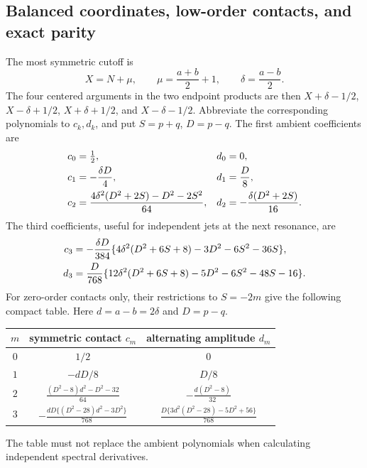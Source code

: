 \documentclass[11pt,letterpaper]{article}
\numberwithin{equation}{section}
\theoremstyle{definition}
\theoremstyle{remark}
\begin{document}
\subsection{Balanced coordinates, low-order contacts, and exact parity}

The most symmetric cutoff is
\begin{equation}\label{ct:balanced}
 X=N+\mu,\qquad \mu=\frac{a+b}{2}+1,\qquad
 \delta=\frac{a-b}{2}.
\end{equation}
The four centered arguments in the two endpoint products are then
$X+\delta-1/2$, $X-\delta+1/2$, $X+\delta+1/2$, and
$X-\delta-1/2$. Abbreviate the corresponding polynomials to $c_k,d_k$,
and put $S=p+q$, $D=p-q$. The first ambient coefficients are
\begin{align}
 c_0&=\tfrac12,&d_0&=0,\notag\\
 c_1&=-\frac{\delta D}{4},&d_1&=\frac D8,\label{ct:lowambient}\\
 c_2&=\frac{4\delta^2(D^2+2S)-D^2-2S^2}{64},&
 d_2&=-\frac{\delta(D^2+2S)}{16}.\notag
\end{align}
The third coefficients, useful for independent jets at the next resonance,
are
\begin{align}
 c_3&=-\frac{\delta D}{384}
 \{4\delta^2(D^2+6S+8)-3D^2-6S^2-36S\},\label{ct:thirdambient}\\
 d_3&=\frac D{768}
 \{12\delta^2(D^2+6S+8)-5D^2-6S^2-48S-16\}.\notag
\end{align}
For zero-order contacts only, their restrictions to $S=-2m$ give the
following compact table. Here $d=a-b=2\delta$ and $D=p-q$.
\begin{center}
\renewcommand{\arraystretch}{1.6}
\begin{tabular}{c|c|c}
$m$&symmetric contact $c_m$&alternating amplitude $d_m$\\\hline
$0$&$1/2$&$0$\\
$1$&$-dD/8$&$D/8$\\
$2$&$\displaystyle\frac{(D^2-8)d^2-D^2-32}{64}$
   &$\displaystyle-\frac{d(D^2-8)}{32}$\\
$3$&$\displaystyle-\frac{dD\{(D^2-28)d^2-3D^2\}}{768}$
   &$\displaystyle\frac{D\{3d^2(D^2-28)-5D^2+56\}}{768}$
\end{tabular}
\end{center}
The table must not replace the ambient polynomials when calculating
independent spectral derivatives.
\end{document}
